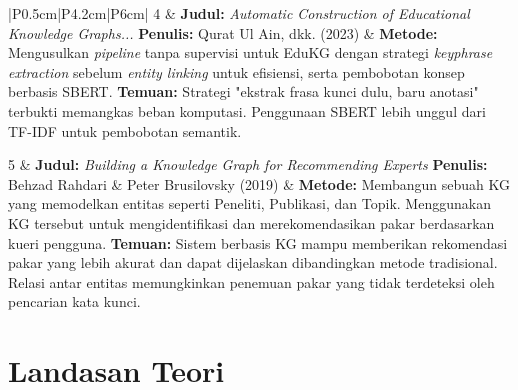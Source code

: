 \begin{center}
\begin{longtable}{|P{0.5cm}|P{4.2cm}|P{6cm}|}
		4 &
		\textbf{Judul:} \textit{Automatic Construction of Educational Knowledge Graphs...}\newline
		\textbf{Penulis:} Qurat Ul Ain, dkk. (2023) &
		\textbf{Metode:} Mengusulkan \textit{pipeline} tanpa supervisi untuk EduKG dengan strategi \textit{keyphrase extraction} sebelum \textit{entity linking} untuk efisiensi, serta pembobotan konsep berbasis SBERT.\newline
		\textbf{Temuan:} Strategi "ekstrak frasa kunci dulu, baru anotasi" terbukti memangkas beban komputasi. Penggunaan SBERT lebih unggul dari TF-IDF untuk pembobotan semantik.\\
		\hline
		
		5 &
		\textbf{Judul:} \textit{Building a Knowledge Graph for Recommending Experts}\newline
		\textbf{Penulis:} Behzad Rahdari \& Peter Brusilovsky (2019) &
		\textbf{Metode:} Membangun sebuah KG yang memodelkan entitas seperti Peneliti, Publikasi, dan Topik. Menggunakan KG tersebut untuk mengidentifikasi dan merekomendasikan pakar berdasarkan kueri pengguna.\newline
		\textbf{Temuan:} Sistem berbasis KG mampu memberikan rekomendasi pakar yang lebih akurat dan dapat dijelaskan dibandingkan metode tradisional. Relasi antar entitas memungkinkan penemuan pakar yang tidak terdeteksi oleh pencarian kata kunci.\\
		\hline
	\end{longtable}
\end{center}

\section{Landasan Teori}
